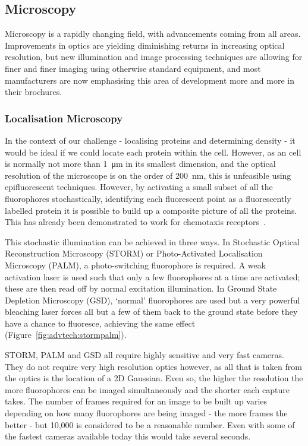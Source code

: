 \documentclass[../main.tex]{subfiles}
\begin{document}
\subsection{Microscopy}

Microscopy is a rapidly changing field, with advancements coming from all areas. Improvements in optics are yielding diminishing returns in increasing optical resolution, but new illumination and image processing techniques are allowing for finer and finer imaging using otherwise standard equipment, and most manufacturers are now emphasising this area of development more and more in their brochures.

\subsubsection{Localisation Microscopy}
In the context of our challenge - localising proteins and determining density - it would be ideal if we could locate each protein within the \ecoli cell. However, as an \ecoli cell is normally not more than \SI{1}{\micro\meter} in its smallest dimension, and the optical resolution of the microscope is on the order of \SI{200}{\nano\meter}, this is unfeasible using epifluorescent techniques. However, by activating a small subset of all the fluorophores stochastically, identifying each fluorescent point as a fluorescently labelled protein it is possible to build up a composite picture of all the proteins. This has already been demonstrated to work for \ecoli chemotaxis receptors~\citep{greenfield09}.

This stochastic illumination can be achieved in three ways. In Stochastic Optical Reconstruction Microscopy (STORM) or Photo-Activated Localisation Microscopy (PALM), a photo-switching fluorophore is required. A weak activation laser is used such that only a few fluorophores at a time are activated; these are then read off by normal excitation illumination. In Ground State Depletion Microscopy (GSD), `normal' fluorophores are used but a very powerful bleaching laser forces all but a few of them back to the ground state before they have a chance to fluoresce, achieving the same effect (Figure~\ref{fig:advtech:stormpalm}).

STORM, PALM and GSD all require highly sensitive and very fast cameras. They do not require very high resolution optics however, as all that is taken from the optics is the location of a 2D Gaussian. Even so, the higher the resolution the more fluorophores can be imaged simultaneously and the shorter each capture takes. The number of frames required for an image to be built up varies depending on how many fluorophores are being imaged - the more frames the better - but 10,000 is considered to be a reasonable number. Even with some of the fastest cameras available today this would take several seconds.
\end{document}
